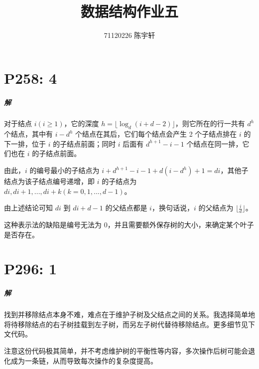 \documentclass[11pt]{ctexrep}
\title{数据结构作业五}
\author{71120226 陈宇轩}
\begin{document}
    \maketitle

    \tableofcontents

    \chapter{P258: 4}

    \paragraph{解} 对于结点 $i (i \ge 1)$，它的深度 $h = \lfloor \log_d (i + d - 2) \rfloor$，则它所在的行一共有 $d^h$ 个结点，其中有 $i - d^h$ 个结点在其后，它们每个结点会产生 2 个子结点排在 $i$ 的下一排，位于 $i$ 的子结点前面；同时 $i$ 后面有 $d^{h+1} - i - 1$ 个结点在同一排，它们也在 $i$ 的子结点前面。
    
    由此，$i$ 的编号最小的子结点为 $i + d^{h+1} - i - 1 + d(i - d^h) + 1 = di$，其他子结点为该子结点编号递增，即 $i$ 的子结点为 $di, di + 1, ..., di + k (k = 0, 1, ..., d-1)$。
    
    由上述结论可知 $di$ 到 $di + d - 1$ 的父结点都是 $i$，换句话说，$i$ 的父结点为 $\lfloor \frac{i}{d} \rfloor$。

    这种表示法的缺陷是编号无法为 0，并且需要额外保存树的大小，来确定某个叶子是否存在。

    \chapter{P296: 1}

    \paragraph{解} 找到并移除结点本身不难，难点在于维护子树及父结点之间的关系。我选择简单地将待移除结点的右子树挂载到左子树，而另左子树代替待移除结点。更多细节见下文代码。
    
    注意这份代码极其简单，并不考虑维护树的平衡性等内容，多次操作后树可能会退化成为一条链，从而导致每次操作的复杂度提高。
\end{document}

